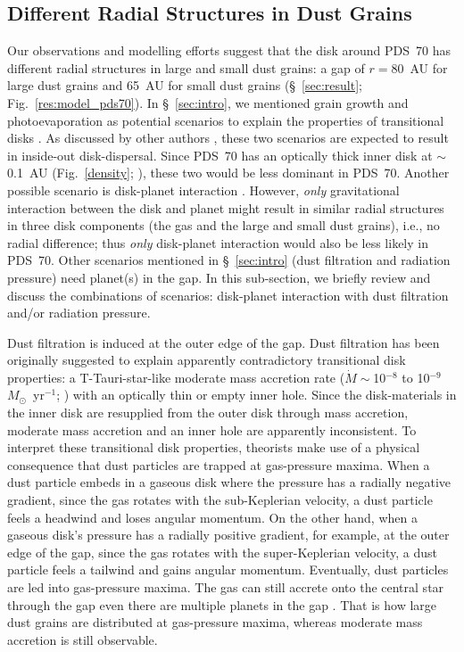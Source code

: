 \documentclass[apj]{emulateapj-rtx4}
\begin{document}
  \subsection{Different Radial Structures in Dust Grains}\label{sec:structure} 
  
  Our observations and modelling efforts suggest that 
  the disk around PDS~70 has different radial structures in large and small dust grains: a gap of $r=$80~AU for large dust 
  grains and 65~AU for small dust grains (\S~\ref{sec:result}; Fig.~\ref{res:model_pds70}). In \S~\ref{sec:intro}, we mentioned 
  grain growth and photoevaporation as potential scenarios to explain the properties of transitional disks \citep[e.g.,][]{clar01,dull05}.
  As discussed by other authors \citep[e.g.,][]{espa14}, these two scenarios are expected to result in inside-out disk-dispersal.
  Since PDS~70 has an optically thick inner disk at $\sim$0.1~AU (Fig.~\ref{density}; \citealt{hash12}), these two would be less 
  dominant in PDS~70. Another possible scenario is disk-planet interaction \citep[e.g.,][]{kley12}. 
  However, {\it only} gravitational interaction between the disk and planet might result in similar radial structures in
  three disk components (the gas and the large and small dust grains), i.e., no radial difference; thus
  {\it only} disk-planet interaction would also be less likely in PDS~70.
  Other scenarios mentioned in \S~\ref{sec:intro} (dust filtration and radiation pressure) need planet(s) in the gap.
  In this sub-section, we briefly review and discuss the combinations of scenarios: disk-planet interaction with dust filtration 
  and/or radiation pressure.

  Dust filtration \citep{rice06,zhu12,pini12,deju13,owen14} is induced at the outer edge of the gap. Dust filtration has been originally 
  suggested to explain apparently contradictory transitional disk properties: a T-Tauri-star-like moderate mass accretion rate 
  ($\dot{M} \sim$10$^{-8}$ to 10$^{-9}$~$M_{\odot}$~yr$^{-1}$; \citealt{naji07}) with an optically thin or empty inner hole. 
  Since the disk-materials in the inner disk are resupplied from the outer disk through mass accretion, moderate mass accretion and 
  an inner hole are apparently inconsistent. To interpret these transitional disk properties, 
  theorists make use of a physical consequence that dust particles are trapped at gas-pressure maxima. When a dust particle embeds
  in a gaseous disk where the pressure has a radially negative gradient, since the gas rotates with the sub-Keplerian velocity,
  a dust particle feels a headwind and loses angular momentum. On the other hand, when a gaseous disk's pressure has a radially positive
  gradient, for example, at the outer edge of the gap, since the gas rotates with the super-Keplerian velocity, a dust particle feels 
  a tailwind and gains angular momentum. Eventually, dust particles are led into gas-pressure maxima. The gas can still accrete onto the 
  central star through the gap \citep{lubo06} even there are multiple planets in the gap \citep{dods11,zhu11}. 
  That is how large dust grains are distributed at gas-pressure maxima, whereas moderate mass accretion is still observable. 
\end{document}
